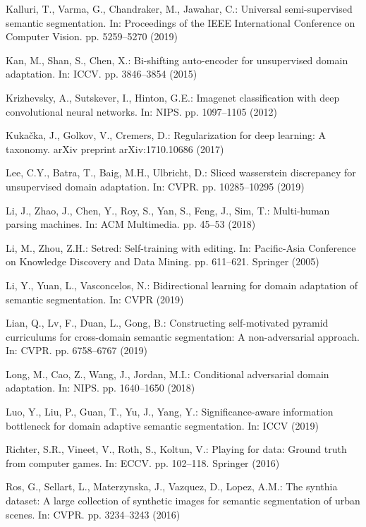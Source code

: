 \documentclass[runningheads]{llncs}
\begin{document}
\begin{thebibliography}{10}
Kalluri, T., Varma, G., Chandraker, M., Jawahar, C.: Universal semi-supervised
  semantic segmentation. In: Proceedings of the IEEE International Conference
  on Computer Vision. pp. 5259--5270 (2019)

Kan, M., Shan, S., Chen, X.: Bi-shifting auto-encoder for unsupervised domain
  adaptation. In: ICCV. pp. 3846--3854 (2015)

Krizhevsky, A., Sutskever, I., Hinton, G.E.: Imagenet classification with deep
  convolutional neural networks. In: NIPS. pp. 1097--1105 (2012)

Kuka{\v{c}}ka, J., Golkov, V., Cremers, D.: Regularization for deep learning: A
  taxonomy. arXiv preprint arXiv:1710.10686  (2017)

Lee, C.Y., Batra, T., Baig, M.H., Ulbricht, D.: Sliced wasserstein discrepancy
  for unsupervised domain adaptation. In: CVPR. pp. 10285--10295 (2019)

Li, J., Zhao, J., Chen, Y., Roy, S., Yan, S., Feng, J., Sim, T.: Multi-human
  parsing machines. In: ACM Multimedia. pp. 45--53 (2018)

Li, M., Zhou, Z.H.: Setred: Self-training with editing. In: Pacific-Asia
  Conference on Knowledge Discovery and Data Mining. pp. 611--621. Springer
  (2005)

Li, Y., Yuan, L., Vasconcelos, N.: Bidirectional learning for domain adaptation
  of semantic segmentation. In: CVPR (2019)

Lian, Q., Lv, F., Duan, L., Gong, B.: Constructing self-motivated pyramid
  curriculums for cross-domain semantic segmentation: A non-adversarial
  approach. In: CVPR. pp. 6758--6767 (2019)

Long, M., Cao, Z., Wang, J., Jordan, M.I.: Conditional adversarial domain
  adaptation. In: NIPS. pp. 1640--1650 (2018)

Luo, Y., Liu, P., Guan, T., Yu, J., Yang, Y.: Significance-aware information
  bottleneck for domain adaptive semantic segmentation. In: ICCV (2019)

Richter, S.R., Vineet, V., Roth, S., Koltun, V.: Playing for data: Ground truth
  from computer games. In: ECCV. pp. 102--118. Springer (2016)

Ros, G., Sellart, L., Materzynska, J., Vazquez, D., Lopez, A.M.: The synthia
  dataset: A large collection of synthetic images for semantic segmentation of
  urban scenes. In: CVPR. pp. 3234--3243 (2016)


\end{thebibliography}
\end{document}
